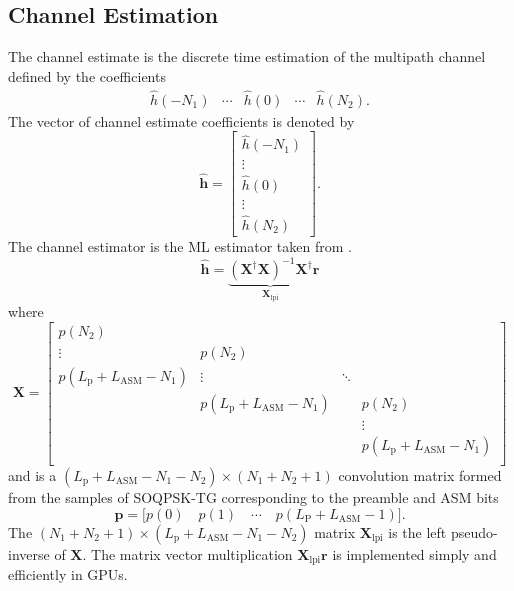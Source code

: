 \subsection{Channel Estimation}
\label{sec:channel_estimation}
The channel estimate is the discrete time estimation of the multipath channel defined by the coefficients
\begin{equation}
\begin{matrix}
\hat{h}(-N_1) & \cdots & \hat{h}(0) & \cdots & \hat{h}(N_2).
\end{matrix}
\end{equation}
The vector of channel estimate coefficients is denoted by 
\begin{equation}
\mathbf{\hat{h}} = 
\begin{bmatrix}
\hat{h}(-N_1) \\ \vdots \\ \hat{h}(0) \\ \vdots \\ \hat{h}(N_2)
\end{bmatrix}.
\end{equation}
The channel estimator is the ML estimator taken from \cite[eq. 8]{rice-afran-saquib-cole-rhodes-moazzami:2014}.
\begin{equation}
\hat{\mathbf{h}} = \underbrace{ \left( \mathbf{X}^\dag\mathbf{X} \right)^{-1} \mathbf{X}^\dag}_{\mathbf{X}_\text{lpi}}\mathbf{r}
\end{equation}
where 
\begin{equation}
\mathbf{X} = 
		\begin{bmatrix}
		p(N_2)							& 								& 		&  			\\
		\vdots 							& p(N_2)						& 		&  			\\
		p(L_\text{p}+L_\text{ASM}-N_1)	&\vdots							& \ddots&  			\\
										& p(L_\text{p}+L_\text{ASM}-N_1)&  		& p(N_2)  	\\
		 								&  								&  		& \vdots 	\\
		 								&  	   							&  		& p(L_\text{p}+L_\text{ASM}-N_1)\\
	\end{bmatrix}
\end{equation}
and
is a $(L_\text{p}+L_\text{ASM}-N_1-N_2)\times(N_1+N_2+1)$ convolution matrix formed from the samples of SOQPSK-TG corresponding to the preamble and ASM bits
\begin{equation}
\mathbf{p} = \big[ p(0) \quad p(1) \quad \cdots  \quad  p(L_\text{P} + L_\text{ASM}-1) \big].
\label{eq:preamble_ASM}
\end{equation}
The $(N_1+N_2+1)\times(L_\text{p}+L_\text{ASM}-N_1-N_2)$ matrix $\mathbf{X}_\text{lpi}$ is the left pseudo-inverse of $\mathbf{X}$.
The matrix vector multiplication $\mathbf{X}_\text{lpi} \mathbf{r}$ is implemented simply and efficiently in GPUs.


